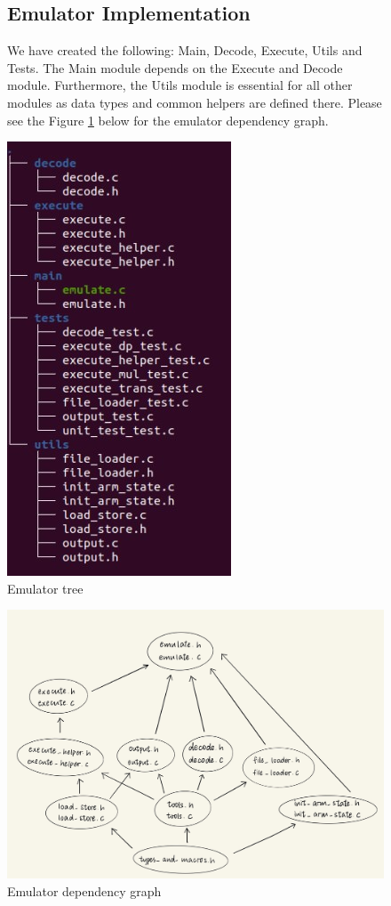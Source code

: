 \documentclass{article}
\begin{document}
\begin{figure}[ht]
\begin{minipage}{0.6\linewidth}
    \subsection{Emulator Implementation}
    	We have created the following: Main, Decode, Execute, Utils and Tests. The Main module depends on the Execute and Decode module. Furthermore, the Utils module is essential for all other modules as data types and common helpers are defined there. Please see the Figure \ref{fig:Emulator dependency graph} below for the emulator dependency graph.
\end{minipage}
\quad
\begin{minipage}{0.5\linewidth}
    \centering          
    \includegraphics[width=0.55\hsize]{./final_report_figure/tree_emulator} 
    \caption{Emulator tree} 
\end{minipage}
\end{figure}

\begin{figure}
    \centering
    \includegraphics[width=0.4\hsize]{./final_report_figure/emulator_dependency_graph}
    \caption{Emulator dependency graph}
    \label{fig:Emulator dependency graph}
\end{figure}
\end{document}
